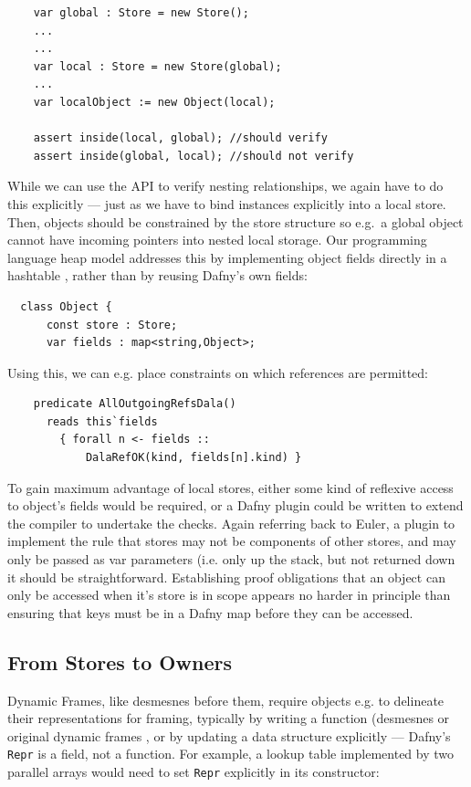 \begin{lstlisting}
    var global : Store = new Store();
    ...
    ...
    var local : Store = new Store(global);
    ...
    var localObject := new Object(local);

    assert inside(local, global); //should verify
    assert inside(global, local); //should not verify
\end{lstlisting}

While we can use the API to verify nesting relationships, we again
have to do this explicitly --- just as we have to bind instances
explicitly into a local store.  Then, objects should be constrained by
the store structure so e.g.\ a global object cannot have incoming
pointers into nested local storage.  Our programming language heap
model addresses this by implementing object fields directly in a
hashtable \cite{dafnydala-ftfjp2024}, rather than by reusing Dafny's
own fields:
\pagebreak[3]

\begin{lstlisting}
  class Object {  
      const store : Store;
      var fields : map<string,Object>;  
\end{lstlisting}

Using this, we can e.g. place constraints on which references are
permitted:


\begin{lstlisting}
    predicate AllOutgoingRefsDala()
      reads this`fields
        { forall n <- fields ::
            DalaRefOK(kind, fields[n].kind) }
\end{lstlisting}

To gain maximum advantage of local stores, either some kind of
reflexive access to object's fields would be required, or a Dafny
plugin could be written to extend the compiler to undertake the
checks. Again referring back to Euler, a plugin to implement the
rule that stores may not be components of other stores, and may only
be passed as var parameters (i.e. only up the stack,  but not returned
down it should be straightforward. Establishing proof obligations
that an object can only be accessed when it's store is in scope
appears no harder in principle than ensuring that keys must be in a
Dafny map before they can be accessed. 


\subsection{From Stores to Owners}

Dynamic Frames, like desmesnes before them, require objects e.g. to
delineate their representations for framing, typically by writing a
function (desmesnes \cite{wills91} or original dynamic frames
\cite{dynamic-frames-fm2006}, or by updating a data structure
explicitly --- Dafny's \lstinline+Repr+ is a field, not a function.
For example, a lookup table implemented by two parallel arrays
would need to set \lstinline+Repr+ explicitly in its constructor:

